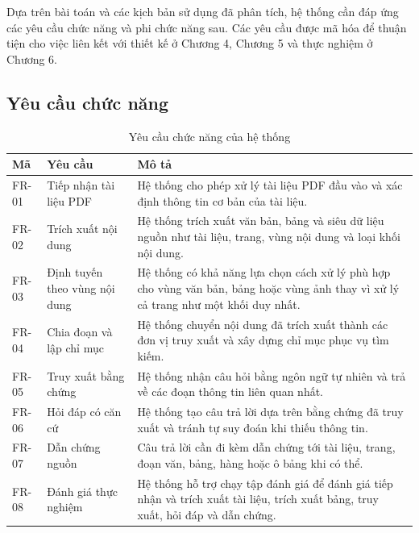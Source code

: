 \documentclass[../DoAn.tex]{subfiles}
\begin{document}
Dựa trên bài toán và các kịch bản sử dụng đã phân tích, hệ thống cần đáp ứng các
yêu cầu chức năng và phi chức năng sau. Các yêu cầu được mã hóa để thuận tiện
cho việc liên kết với thiết kế ở Chương 4, Chương 5 và thực nghiệm ở Chương 6.

\subsection{Yêu cầu chức năng}

\begin{table}[H]
\centering
\small
\renewcommand{\arraystretch}{1.2}
\caption{Yêu cầu chức năng của hệ thống}
\label{tab:functional-requirements}
\begin{tabularx}{\textwidth}{
    |>{\centering\arraybackslash}p{}
    |>{\raggedright\arraybackslash}p{}
    |>{\raggedright\arraybackslash}X|
}
\hline
\textbf{Mã} & \textbf{Yêu cầu} & \textbf{Mô tả} \\
\hline
FR-01 & Tiếp nhận tài liệu PDF &
Hệ thống cho phép xử lý tài liệu PDF đầu vào và xác định thông tin cơ bản của
tài liệu. \\
\hline
FR-02 & Trích xuất nội dung &
Hệ thống trích xuất văn bản, bảng và siêu dữ liệu nguồn như tài liệu, trang, vùng
nội dung và loại khối nội dung. \\
\hline
FR-03 & Định tuyến theo vùng nội dung &
Hệ thống có khả năng lựa chọn cách xử lý phù hợp cho vùng văn bản, bảng hoặc
vùng ảnh thay vì xử lý cả trang như một khối duy nhất. \\
\hline
FR-04 & Chia đoạn và lập chỉ mục &
Hệ thống chuyển nội dung đã trích xuất thành các đơn vị truy xuất và xây dựng
chỉ mục phục vụ tìm kiếm. \\
\hline
FR-05 & Truy xuất bằng chứng &
Hệ thống nhận câu hỏi bằng ngôn ngữ tự nhiên và trả về các đoạn thông tin liên
quan nhất. \\
\hline
FR-06 & Hỏi đáp có căn cứ &
Hệ thống tạo câu trả lời dựa trên bằng chứng đã truy xuất và tránh tự suy đoán
khi thiếu thông tin. \\
\hline
FR-07 & Dẫn chứng nguồn &
Câu trả lời cần đi kèm dẫn chứng tới tài liệu, trang, đoạn văn, bảng, hàng hoặc ô
bảng khi có thể. \\
\hline
FR-08 & Đánh giá thực nghiệm &
Hệ thống hỗ trợ chạy tập đánh giá để đánh giá tiếp nhận và trích xuất tài liệu, trích xuất bảng, truy xuất,
hỏi đáp và dẫn chứng. \\
\hline
\end{tabularx}
\end{table}
\end{document}
